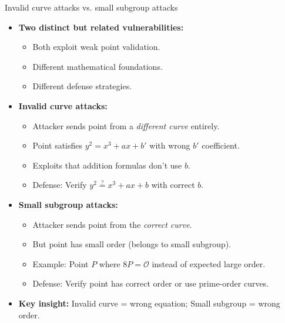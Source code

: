 \documentclass[aspectratio=169, lualatex, handout]{beamer}
\begin{document}
\begin{frame}{Invalid curve attacks vs. small subgroup attacks}
	\begin{itemize}
		\item \textbf{Two distinct but related vulnerabilities:}
		      \begin{itemize}
			      \item Both exploit weak point validation.
			      \item Different mathematical foundations.
			      \item Different defense strategies.
		      \end{itemize}
		\item \textbf{Invalid curve attacks:}
		      \begin{itemize}
			      \item Attacker sends point from a \emph{different curve} entirely.
			      \item Point satisfies $y^2 = x^3 + ax + b'$ with wrong $b'$ coefficient.
			      \item Exploits that addition formulas don't use $b$.
			      \item Defense: Verify $y^2 \stackrel{?}{=} x^3 + ax + b$ with correct $b$.
		      \end{itemize}
		\item \textbf{Small subgroup attacks:}
		      \begin{itemize}
			      \item Attacker sends point from the \emph{correct curve}.
			      \item But point has small order (belongs to small subgroup).
			      \item Example: Point $P$ where $8P = \mathcal{O}$ instead of expected large order.
			      \item Defense: Verify point has correct order or use prime-order curves.
		      \end{itemize}
		\item \textbf{Key insight:} Invalid curve = wrong equation; Small subgroup = wrong order.
	\end{itemize}
\end{frame}
\end{document}
